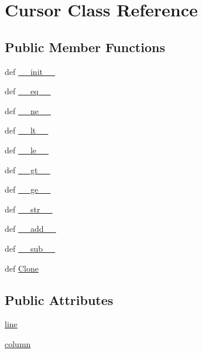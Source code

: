 \hypertarget{classpump_1_1Cursor}{\section{\-Cursor \-Class \-Reference}
\label{dd/da8/classpump_1_1Cursor}
}
\subsection*{\-Public \-Member \-Functions}
\begin{DoxyCompactItemize}
\item 
def \hyperlink{classpump_1_1Cursor_ac775ee34451fdfa742b318538164070e}{\-\_\-\-\_\-init\-\_\-\-\_\-}
\item 
def \hyperlink{classpump_1_1Cursor_a449f8fd74d358c0ad641b6c6d6917ba0}{\-\_\-\-\_\-eq\-\_\-\-\_\-}
\item 
def \hyperlink{classpump_1_1Cursor_ad69df72a6bf0be3525fe45cd2f77f343}{\-\_\-\-\_\-ne\-\_\-\-\_\-}
\item 
def \hyperlink{classpump_1_1Cursor_a6a45920abc8ecf2d458d174ea7304f8a}{\-\_\-\-\_\-lt\-\_\-\-\_\-}
\item 
def \hyperlink{classpump_1_1Cursor_a83166e4aabc2805e71aef3a43f016181}{\-\_\-\-\_\-le\-\_\-\-\_\-}
\item 
def \hyperlink{classpump_1_1Cursor_a728aec3eafa75fd847ce0bf8f954efde}{\-\_\-\-\_\-gt\-\_\-\-\_\-}
\item 
def \hyperlink{classpump_1_1Cursor_a3ee81c22a31860655ba6bf83ff5a8f36}{\-\_\-\-\_\-ge\-\_\-\-\_\-}
\item 
def \hyperlink{classpump_1_1Cursor_aa7a4b9bc0941308e362738503137460e}{\-\_\-\-\_\-str\-\_\-\-\_\-}
\item 
def \hyperlink{classpump_1_1Cursor_ae92943b217d29a45ddcbbba2f7208afc}{\-\_\-\-\_\-add\-\_\-\-\_\-}
\item 
def \hyperlink{classpump_1_1Cursor_a92f51217c100657d0bf6f97b150c0a7c}{\-\_\-\-\_\-sub\-\_\-\-\_\-}
\item 
def \hyperlink{classpump_1_1Cursor_aff981755ef197de06774d0c1cf6cceb9}{\-Clone}
\end{DoxyCompactItemize}
\subsection*{\-Public \-Attributes}
\begin{DoxyCompactItemize}
\item 
\hyperlink{classpump_1_1Cursor_a4fa05b1f00fcde100685cc887554b93b}{line}
\item 
\hyperlink{classpump_1_1Cursor_ae78e6e11a40e6dba1bae097358f97d15}{column}
\end{DoxyCompactItemize}


